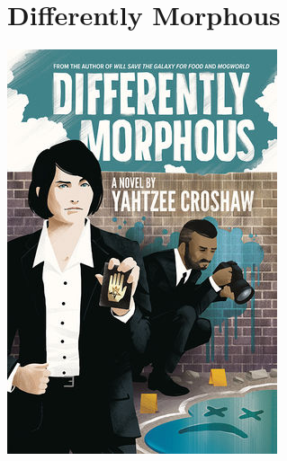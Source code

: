\documentclass{tufte-handout}
\makeatletter
\newcommand{\varcaption}[2][0pt]{%
  \gsetlength{\@tufte@caption@vertical@offset}{-#1}%
  \gdef\@tufte@stored@varcaption{#2}%
}
\gdef\@tufte@stored@varcaption{} %
\makeatother
\begin{document}
\section*{Differently Morphous}
\begin{marginfigure}[9\baselineskip]
   \includegraphics[width=\linewidth]{images/differently_morphous.jpg}
   \varcaption{\href{https://www.darkhorse.com/Books/3003-029/Differently-Morphous-TPB}{Publisher Link}, \href{https://www.amazon.com/Differently-Morphous-Yahtzee-Croshaw/dp/1506711642/}{Amazon Link}}
\end{marginfigure}
\end{document}
